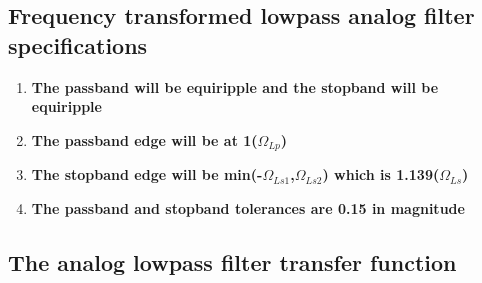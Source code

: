 \documentclass[12pt]{article}
\begin{document}
\subsection{Frequency transformed lowpass analog filter specifications}
\begin{enumerate}
    \item \textbf{The passband will be equiripple and the stopband will be equiripple}
    \item \textbf{The passband edge will be at 1($\Omega_{Lp}$)}
    \item \textbf{The stopband edge will be min(-$\Omega_{Ls1}$,$\Omega_{Ls2}$) which is 1.139($\Omega_{Ls}$)}
    \item \textbf{The passband and stopband tolerances are 0.15 in magnitude}

\end{enumerate}

\newpage
\subsection{The analog lowpass filter transfer function}
\end{document}
